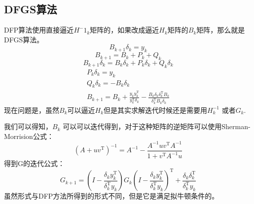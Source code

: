 \documentclass[UTF8]{ctexart}
\begin{document}
\subsection{DFGS算法}
DFP算法使用直接逼近$H^-1_k$矩阵的，如果改成逼近$H_k$矩阵的$B_k$矩阵，那么就是DFGS算法。
$$B_{k+1} \delta_{k}=y_{k}$$
$$B_{k+1}=B_{k}+P_{k}+Q_{k}$$
$$B_{k+1} \delta_{k}=B_{k} \delta_{k}+P_{k} \delta_{k}+Q_{k} \delta_{k}$$
$$\begin{array}{c}
P_{k} \delta_{k}=y_{k} \\
Q_{k} \delta_{k}=-B_{k} \delta_{k}\\
B_{k+1}=B_{k}+\frac{y_{k} y_{k}^{\mathrm{T}}}{y_{k}^{\mathrm{T}} \delta_{k}}-\frac{B_{k} \delta_{k} \delta_{k}^{\mathrm{T}} B_{k}}{\delta_{k}^{\mathrm{T}} B_{k} \delta_{k}}
\end{array}$$
现在问题是，虽然$B_k$可以逼近$H_k$但是其实求解迭代时候还是需要用$H^{-1}_k$ 或者$G_{k}$.

我们可以得知，$B_k$ 可以可以迭代得到，对于这种矩阵的逆矩阵可以使用Sherman-Morrision公式：
$$\left(A+u v^{\mathrm{T}}\right)^{-1}=A^{-1}-\frac{A^{-1} u v^{\mathrm{T}} A^{-1}}{1+v^{\mathrm{T}} A^{-1} u}$$
得到G的迭代公式：
$$G_{k+1}=\left(I-\frac{\delta_{k} y_{k}^{\mathrm{T}}}{\delta_{k}^{\mathrm{T}} y_{k}}\right) G_{k}\left(I-\frac{\delta_{k} y_{k}^{\mathrm{T}}}{\delta_{k}^{\mathrm{T}} y_{k}}\right)^{\mathrm{T}}+\frac{\delta_{k} \delta_{k}^{\mathrm{T}}}{\delta_{k}^{\mathrm{T}} y_{k}}$$
虽然形式与DFP方法所得到的形式不同，但是它是满足拟牛顿条件的。
\end{document}
